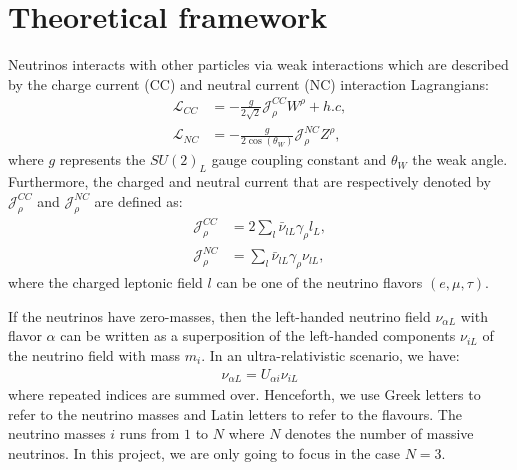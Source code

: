 \documentclass[twocolumn,secnumarabic,amssymb, nobibnotes, aps, prd,10pt]{revtex4-1}
\begin{document}
\section{Theoretical framework}
\label{sec:theory}

Neutrinos interacts with other particles via weak interactions which are described
by the charge current (CC) and neutral current (NC) interaction Lagrangians:
\begin{align}
\mathcal{L}_{CC} &= - \frac{g}{2 \sqrt{2}} \mathcal{J}^{CC}_\rho W^\rho + h.c, \\
\mathcal{L}_{NC} &= - \frac{g}{2 \cos(\theta_W)} \mathcal{J}^{NC}_\rho Z^\rho,
\end{align}
where $g$ represents the $SU(2)_L$ gauge coupling constant and $\theta_W$ the weak
angle. Furthermore, the charged and neutral current that are respectively denoted
by $\mathcal{J}^{CC}_\rho$ and $\mathcal{J}^{NC}_\rho$ are defined as:
\begin{align}
\mathcal{J}^{CC}_\rho &= 2 \sum_{l} \bar{\nu}_{lL} \gamma_\rho l_L, \\
\mathcal{J}^{NC}_\rho &= \sum_{l} \bar{\nu}_{lL} \gamma_\rho \nu_{lL},
\end{align}
where the charged leptonic field $l$ can be one of the neutrino flavors $(e, \mu, \tau)$.

If the neutrinos have zero-masses, then the left-handed neutrino field $\nu_{\alpha L}$
with flavor $\alpha$ can be written as a superposition of the left-handed components
$\nu_{iL}$ of the neutrino field with mass $m_i$. In an ultra-relativistic scenario, we
have:
\begin{align}
\nu_{\alpha L} = U_{\alpha i} \nu_{i L}
\label{eq:superposition}
\end{align} 
where repeated indices are summed over. Henceforth, we use Greek letters to refer to
the neutrino masses and Latin letters to refer to the flavours. The neutrino masses
$i$ runs from $1$ to $N$ where $N$ denotes the number of massive neutrinos. In this
project, we are only going to focus in the case $N=3$.
\end{document}
